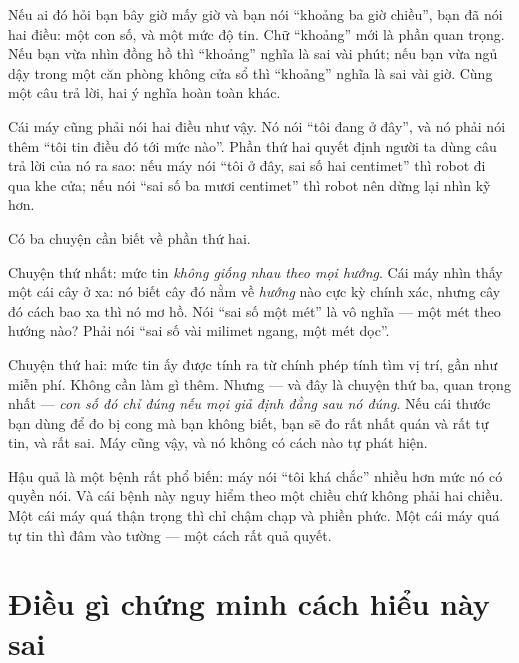 \documentclass[../../vslam.tex]{subfiles}
\begin{document}
\begin{dongian}
Nếu ai đó hỏi bạn bây giờ mấy giờ và bạn nói ``khoảng ba giờ chiều'', bạn đã nói hai điều: một con số, và một mức độ tin. Chữ ``khoảng'' mới là phần quan trọng. Nếu bạn vừa nhìn đồng hồ thì ``khoảng'' nghĩa là sai vài phút; nếu bạn vừa ngủ dậy trong một căn phòng không cửa sổ thì ``khoảng'' nghĩa là sai vài giờ. Cùng một câu trả lời, hai ý nghĩa hoàn toàn khác.

Cái máy cũng phải nói hai điều như vậy. Nó nói ``tôi đang ở đây'', và nó phải nói thêm ``tôi tin điều đó tới mức nào''. Phần thứ hai quyết định người ta dùng câu trả lời của nó ra sao: nếu máy nói ``tôi ở đây, sai số hai centimet'' thì robot đi qua khe cửa; nếu nói ``sai số ba mươi centimet'' thì robot nên dừng lại nhìn kỹ hơn.

Có ba chuyện cần biết về phần thứ hai.

Chuyện thứ nhất: mức tin \emph{không giống nhau theo mọi hướng}. Cái máy nhìn thấy một cái cây ở xa: nó biết cây đó nằm về \emph{hướng} nào cực kỳ chính xác, nhưng cây đó cách bao xa thì nó mơ hồ. Nói ``sai số một mét'' là vô nghĩa --- một mét theo hướng nào? Phải nói ``sai số vài milimet ngang, một mét dọc''.

Chuyện thứ hai: mức tin ấy được tính ra từ chính phép tính tìm vị trí, gần như miễn phí. Không cần làm gì thêm. Nhưng --- và đây là chuyện thứ ba, quan trọng nhất --- \emph{con số đó chỉ đúng nếu mọi giả định đằng sau nó đúng}. Nếu cái thước bạn dùng để đo bị cong mà bạn không biết, bạn sẽ đo rất nhất quán và rất tự tin, và rất sai. Máy cũng vậy, và nó không có cách nào tự phát hiện.

Hậu quả là một bệnh rất phổ biến: máy nói ``tôi khá chắc'' nhiều hơn mức nó có quyền nói. Và cái bệnh này nguy hiểm theo một chiều chứ không phải hai chiều. Một cái máy quá thận trọng thì chỉ chậm chạp và phiền phức. Một cái máy quá tự tin thì đâm vào tường --- một cách rất quả quyết.

\end{dongian}

\section{Điều gì chứng minh cách hiểu này sai}
\end{document}
